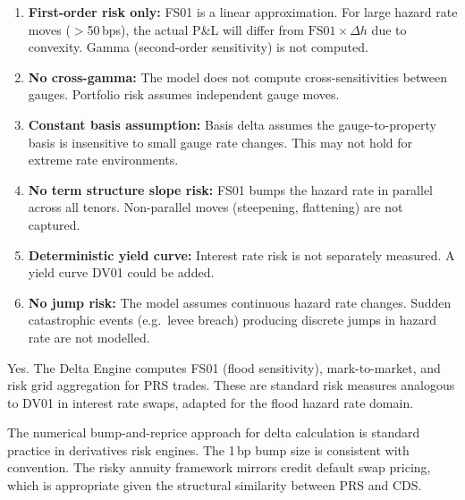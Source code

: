 \documentclass[11pt,a4paper]{article}
\begin{document}
\mkmlimitations

\begin{enumerate}
    \item \textbf{First-order risk only:} FS01 is a linear approximation. For large hazard rate moves ($>$50\,bps), the actual P\&L will differ from $\text{FS01} \times \Delta h$ due to convexity. Gamma (second-order sensitivity) is not computed.
    \item \textbf{No cross-gamma:} The model does not compute cross-sensitivities between gauges. Portfolio risk assumes independent gauge moves.
    \item \textbf{Constant basis assumption:} Basis delta assumes the gauge-to-property basis is insensitive to small gauge rate changes. This may not hold for extreme rate environments.
    \item \textbf{No term structure slope risk:} FS01 bumps the hazard rate in parallel across all tenors. Non-parallel moves (steepening, flattening) are not captured.
    \item \textbf{Deterministic yield curve:} Interest rate risk is not separately measured. A yield curve DV01 could be added.
    \item \textbf{No jump risk:} The model assumes continuous hazard rate changes. Sudden catastrophic events (e.g.\ levee breach) producing discrete jumps in hazard rate are not modelled.
\end{enumerate}

\clearpage

\mkmgovernance


Yes. The Delta Engine computes FS01 (flood sensitivity), mark-to-market, and risk grid aggregation for PRS trades. These are standard risk measures analogous to DV01 in interest rate swaps, adapted for the flood hazard rate domain.


The numerical bump-and-reprice approach for delta calculation is standard practice in derivatives risk engines. The 1\,bp bump size is consistent with convention. The risky annuity framework mirrors credit default swap pricing, which is appropriate given the structural similarity between PRS and CDS.
\end{document}
